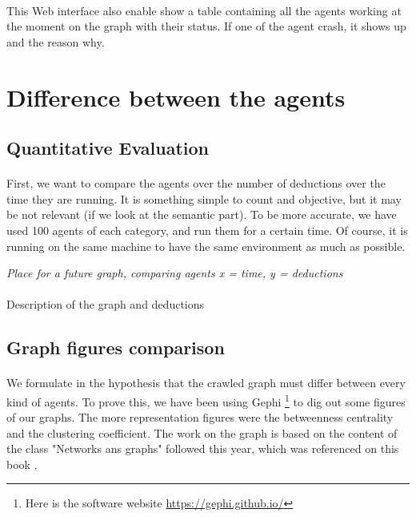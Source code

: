 \documentclass{article}
\begin{document}
		\paragraph{}
			This Web interface also enable show a table containing all the agents working at the moment on the graph with their status.
			If one of the agent crash, it shows up and the reason why.

\section{Difference between the agents}
	\subsection{Quantitative Evaluation}
		\paragraph{}
			First, we want to compare the agents over the number of deductions over the time they are running.
			It is something simple to count and objective, but it may be not relevant (if we look at the semantic part).
			To be more accurate, we have used 100 agents of each category, and run them for a certain time.
			Of course, it is running on the same machine to have the same environment as much as possible.
		\begin{center}
			\textit{Place for a future graph, comparing agents x = time, y = deductions}
		\end{center}
		\paragraph{}
			Description of the graph and deductions
	\subsection{Graph figures comparison}
		\paragraph{}
			We formulate in the hypothesis that the crawled graph must differ between every kind of agents.
			To prove this, we have been using Gephi
			\footnote{Here is the software website \url{https://gephi.github.io/}} to dig out some figures of our graphs.
			The more representation figures were the betweenness centrality and the clustering coefficient.
			The work on the graph is based on the content of the class "Networks ans graphs" followed this year,
			which was referenced on this book \cite{Steen10}.
\end{document}
